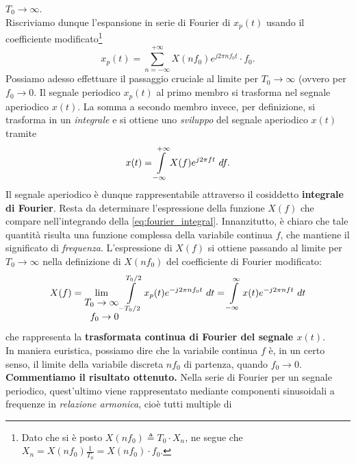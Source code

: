 \documentclass[12pt,oneside,openany]{memoir}
\numberwithin{equation}{subsection}
\newcommand{\dt}{\ dt}
\newcommand{\df}{\ df}
\begin{document}
$T_0 \rightarrow \infty$.\\
Riscriviamo dunque l'espansione in serie di Fourier di $x_p(t)$ usando il
coefficiente modificato\footnote{Dato che si \`e posto
$X(nf_0) \triangleq T_0 \cdot X_n$, ne segue che
$X_n = X(n f_0) \frac{1}{T_0} = X(n f_0) \cdot f_0$.}
\begin{equation}
	x_p(t) = \sum_{n = -\infty}^{+\infty} X(n f_0) e^{j 2 \pi n f_0 t}
	\cdot f_0.
\end{equation}
Possiamo adesso effettuare il passaggio cruciale al limite per
$T_0 \rightarrow \infty$ (ovvero per $f_0 \rightarrow 0$. Il segnale periodico
$x_p(t)$ al primo membro si trasforma nel segnale aperiodico $x(t)$. La somma a
secondo membro invece, per definizione, si trasforma in un \textit{integrale} e
si ottiene uno \textit{sviluppo} del segnale aperiodico $x(t)$ tramite
\begin{equation}\label{eq:fourier_integral}
	x(t) = \int\displaylimits_{-\infty}^{+\infty} X(f) e^{j 2 \pi f t} \df.
\end{equation}
Il segnale aperiodico \`e dunque rappresentabile attraverso il cosiddetto
\textbf{integrale di Fourier}. Resta da determinare l'espressione della funzione
$X(f)$ che compare nell'integrando della \eqref{eq:fourier_integral}.
Innanzitutto, \`e chiaro che tale quantit\`a risulta una funzione complessa
della variabile continua $f$, che mantiene il significato di \textit{frequenza}.
L'espressione di $X(f)$ si ottiene passando al limite per
$T_0 \rightarrow \infty$ nella definizione di $X(nf_0)$ del coefficiente di
Fourier modificato:
\begin{equation}\label{eq:tcf_coefficient}
	X(f) = \lim_{\begin{split}T_0 \rightarrow \infty \\ f_0 \rightarrow 0\end{split}}
		\int\displaylimits_{-T_0/2}^{T_0/2} x_p(t) e^{-j 2 \pi n f_0 t}
		\dt = \int\displaylimits_{-\infty}^{\infty} x(t)
		e^{-j 2 \pi n f t} \dt 
\end{equation}
che rappresenta la \textbf{trasformata continua di Fourier del segnale $x(t)$}.\\
In maniera euristica, possiamo dire che la variabile continua $f$ \`e, in un
certo senso, il limite della variabile discreta $n f_0$ di partenza, quando
$f_0 \rightarrow 0$.
\bigbreak
\textbf{Commentiamo il risultato ottenuto.} Nella serie di Fourier per un
segnale periodico, quest'ultimo viene rappresentato mediante componenti
sinusoidali a frequenze in \textit{relazione armonica}, cio\`e tutti multiple di
\end{document}
